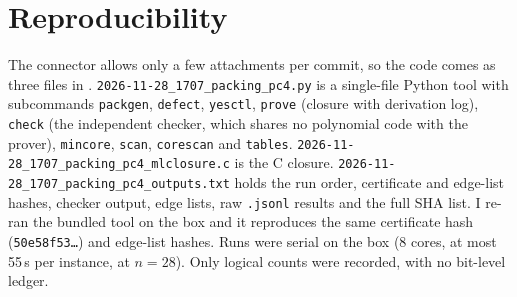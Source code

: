 \documentclass[11pt]{article}
\theoremstyle{remark}
\begin{document}
\section*{Reproducibility}
The connector allows only a few attachments per commit, so the code comes as three files in
. \texttt{2026-11-28\_1707\_packing\_pc4.py} is a
single-file Python tool with subcommands \texttt{packgen}, \texttt{defect}, \texttt{yesctl},
\texttt{prove} (closure with derivation log), \texttt{check} (the independent checker, which
shares no polynomial code with the prover), \texttt{mincore}, \texttt{scan},
\texttt{corescan} and \texttt{tables}. \texttt{2026-11-28\_1707\_packing\_pc4\_mlclosure.c} is
the C closure. \texttt{2026-11-28\_1707\_packing\_pc4\_outputs.txt} holds the run order,
certificate and edge-list hashes, checker output, edge lists, raw \texttt{.jsonl} results and
the full SHA list. I re-ran the bundled tool on the box and it reproduces the same certificate
hash (\texttt{50e58f53\ldots}) and edge-list hashes. Runs were serial on the box (8 cores, at
most 55\,s per instance, at $n=28$). Only logical counts were recorded, with no bit-level
ledger.

\appendix
\end{document}
